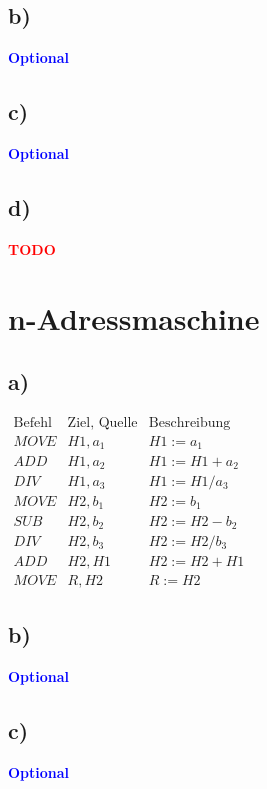 \documentclass[a4paper,11pt]{scrartcl}
\newcommand{\todo}{\textcolor{red}{\textbf{TODO}}}
\newcommand{\opt}{\textcolor{blue}{\textbf{Optional}}}
\begin{document}
\subsection*{b)} \opt
\subsection*{c)} \opt
\subsection*{d)} \todo

\section*{n-Adressmaschine}
\subsection*{a)}
\(
\begin{array}{lll}
	\text{Befehl} & \text{Ziel, Quelle} & \text{Beschreibung} \\
	MOVE & H1, a_1 & H1 := a_1 \\
	ADD  & H1, a_2 & H1 := H1 + a_2 \\
	DIV  & H1, a_3 & H1 := H1 / a_3 \\
	MOVE & H2, b_1 & H2 := b_1 \\
	SUB  & H2, b_2 & H2 := H2 - b_2 \\
	DIV  & H2, b_3 & H2 := H2 / b_3 \\
	ADD  & H2, H1  & H2 := H2 + H1 \\
	MOVE & R, H2   & R := H2
\end{array}
\)
\subsection*{b)} \opt
\subsection*{c)} \opt
\end{document}
